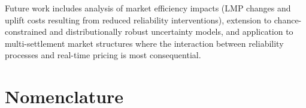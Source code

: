 \documentclass[journal]{IEEEtran}
\begin{document}

Future work includes analysis of market efficiency impacts (LMP
changes and uplift costs resulting from reduced reliability
interventions), extension to chance-constrained and distributionally
robust uncertainty models, and application to multi-settlement market
structures where the interaction between reliability processes and
real-time pricing is most consequential.



\appendices
\section{Nomenclature}\label{app:nomenclature}
\end{document}
